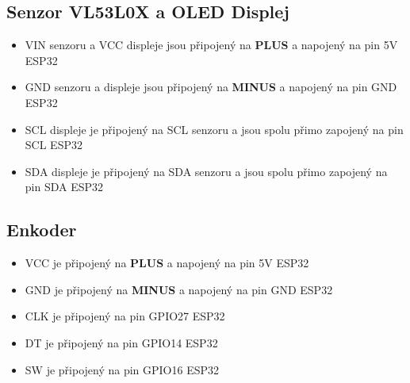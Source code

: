     \begin{spacing}{1.5}
        \subsection*{Senzor VL53L0X a OLED Displej}
        \fontsize{14}{14}\selectfont
        \begin{itemize}
        \item VIN senzoru a VCC displeje jsou připojený na \textbf{PLUS} a napojený na pin 5V ESP32
        \item GND senzoru a displeje jsou připojený na \textbf{MINUS} a napojený na pin GND ESP32
        \item SCL displeje je připojený na SCL senzoru a jsou spolu přimo zapojený na pin SCL ESP32  
        \item SDA displeje je připojený na SDA senzoru a jsou spolu přimo zapojený na pin SDA ESP32
        \end{itemize}
    \end{spacing}

    \begin{spacing}{1.5}
        \subsection*{Enkoder}
        \fontsize{14}{14}\selectfont
        \begin{itemize}
        \item VCC je připojený na \textbf{PLUS} a napojený na pin 5V ESP32
        \item GND je připojený na \textbf{MINUS} a napojený na pin GND ESP32
        \item CLK je připojený na pin GPIO27 ESP32  
        \item DT je připojený na pin GPIO14 ESP32
        \item SW je připojený na pin GPIO16 ESP32
        \end{itemize}
    \end{spacing}
    
    



